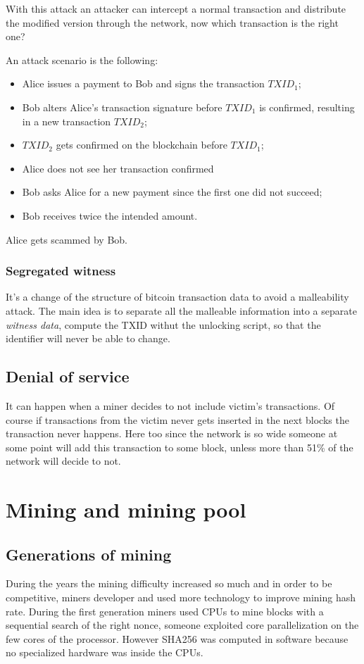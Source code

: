 With this attack an attacker can intercept a normal transaction and distribute the modified version through the network, now which transaction is the right one?

An attack scenario is the following:
\begin{itemize}
    \item Alice issues a payment to Bob and signs the transaction $TXID_{1}$;
    \item Bob alters Alice's transaction signature before $TXID_{1}$ is confirmed, resulting in a new transaction $TXID_{2}$;
    \item $TXID_{2}$ gets confirmed on the blockchain before $TXID_{1}$;
    \item Alice does not see her transaction confirmed
    \item Bob asks Alice for a new payment since the first one did not succeed;
    \item Bob receives twice the intended amount.
\end{itemize}
Alice gets scammed by Bob.

\subsubsection{Segregated witness}
It's a change of the structure of bitcoin transaction data to avoid a malleability attack.
The main idea is to separate all the malleable information into a separate \emph{witness data}, compute the TXID withut the unlocking script, so that the identifier will never be able to change.

\subsection{Denial of service}
It can happen when a miner decides to not include victim's transactions.
Of course if transactions from the victim never gets inserted in the next blocks the transaction never happens.
Here too since the network is so wide someone at some point will add this transaction to some block, unless more than 51\% of the network will decide to not.

\section{Mining and mining pool}
\subsection{Generations of mining}
During the years the mining difficulty increased so much and in order to be competitive, miners developer and used more technology to improve mining hash rate.
During the first generation miners used CPUs to mine blocks with a sequential search of the right nonce, someone exploited core parallelization on the few cores of the processor.
However SHA256 was computed in software because no specialized hardware was inside the CPUs.

